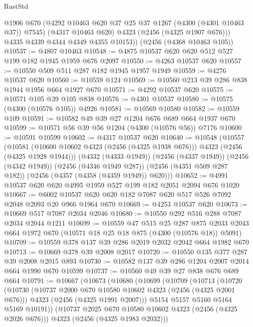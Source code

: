 \begin{lexlean}{RustStd}
\begin{coremodule}
          @1906
          @670
          (@4292 @10463 @620 @37 @25 @37 @1267 (@4300 (@4301 @10463 @37)) @7545)
          (@4317 @10463 @620)
          @4323
          (@2456 (@4325 @1907 @676)))
        @4335
        @4339
        @4344
        @4349
        @4355
        @10153))
    (@2456 (@4368 @10463 @105))
@10537 := @4807 @10463
@10548 := @4875 @10537 @620 @620 @512 @527 @199 @182 @1945 @1959 @676 @2097
@10550 := @4263 @10537 @620
@10557 := @10550 @509 @511 @287 @182 @1945 @1957 @1949
@10559 := @4276 @10537 @620
@10560 := @10559 @124
@10569 := @10560 @213 @39 @286 @838 @1944 @1956 @664 @1927 @670
@10571 := @4292 @10537 @620
@10575 := @10571 @105 @39 @105 @838
@10576 := @4301 @10537
@10580 := @10575 (@4300 (@10576 @105)) @4926
@10581 := @10569 @10580
@10582 := @10559 @109
@10591 := @10582 @49 @39 @27 @1204 @676 @689 @664 @1937 @670
@10599 := @10571 @56 @39 @56 @1204 (@4300 (@10576 @56)) @7176
@10600 := @10591 @10599
@10602 := @4317 @10537 @620
@10640 := @10548
    (@10557
      (@10581 (@10600 @10602 @4323 (@2456 (@4325 @1938 @676))) @4323 (@2456 (@4325 @1928 @1944)))
      (@4332 (@4333 @1949))
      (@2456 (@4337 @1949))
      (@2456 (@4342 @1949))
      (@2456 (@4346 @1949 @287))
      (@2456 (@4351 @509 @287 @182))
      (@2456 (@4357 (@4358 (@4359 @1949)) @620)))
@10652 := @4991 @10537 @620 @620 @4995 @1959 @527 @199 @182 @2051 @2094 @676 @1020
@10667 := @6002 @10537 @620 @620 @182 @7087 @620 @517 @526 @7092 @2048 @2093 @20 @966 @1964 @670
@10669 := @4253 @10537 @620
@10673 := @10669 @517 @7087 @2034 @2046
@10680 := @10550 @292 @516 @288 @7087 @2034 @2044 @1211
@10699 := @10559
    @47
    @515
    @25
    @287
    @875
    @2033
    @2043
    @664
    @1972
    @670
    (@10571 @18 @25 @18 @875 (@4300 (@10576 @18)) @5091)
@10709 := @10559 @378 @137 @39 @286 @2019 @2032 @2042 @664 @1982 @670
@10713 := @10669 @378 @39 @2008 @2017
@10720 := @10550 @135 @377 @287 @39 @2008 @2015 @893
@10730 := @10582 @137 @39 @286 @1204 @2007 @2014 @664 @1990 @670 @10599
@10737 := @10560 @49 @39 @27 @838 @676 @689 @664
@10791 := @10667
    (@10673
      (@10680
        (@10699
          (@10709
            (@10713
              (@10720
                (@10730
                  (@10737 @2000 @670 @10580 @10602 @4323 (@2456 (@4325 @2001 @676)))
                  @4323
                  (@2456 (@4325 @1991 @2007)))
                @5154
                @5157
                @5160
                @5164
                @5169
                @10191))
            (@10737 @2025 @670 @10580 @10602 @4323 (@2456 (@4325 @2026 @676)))
            @4323
            (@2456 (@4325 @1983 @2032)))

\end{coremodule}
\end{lexlean}
